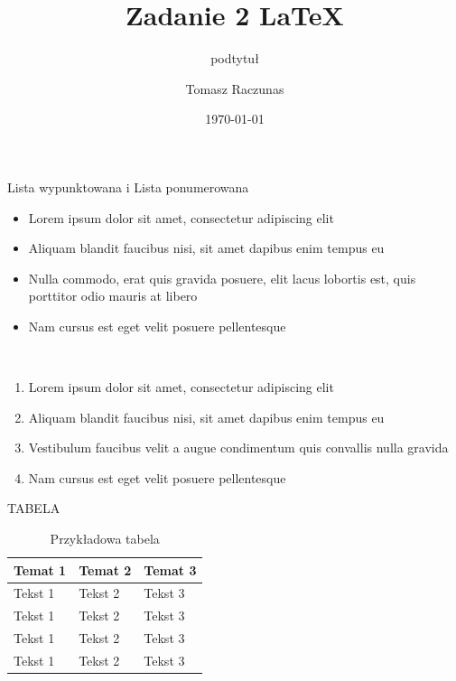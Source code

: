 \documentclass[aspectratio=169,xcolor=dvipsnames, t]{beamer}
\title[short title]{Zadanie 2 LaTeX } %
\subtitle{podtytuł}
\author[autor]{Tomasz Raczunas}
\institute[UG]{Uniwersytet Gdański \newline Wydział Informatyki}
\date{\today} %
\begin{document}
\maketitlepage


\begin{frame}{Lista wypunktowana i Lista ponumerowana}
\pause
    \begin{itemize}
        \item Lorem ipsum dolor sit amet, consectetur adipiscing elit
        \item Aliquam blandit faucibus nisi, sit amet dapibus enim tempus eu
        \item Nulla commodo, erat quis gravida posuere, elit lacus lobortis est, quis porttitor odio mauris at libero
        \item Nam cursus est eget velit posuere pellentesque
    \end{itemize}
\
\pause

    \begin{enumerate}
        \item Lorem ipsum dolor sit amet, consectetur adipiscing elit
        \item Aliquam blandit faucibus nisi, sit amet dapibus enim tempus eu
        \item Vestibulum faucibus velit a augue condimentum quis convallis nulla gravida
        \item Nam cursus est eget velit posuere pellentesque
    \end{enumerate}
\end{frame}


\begin{frame}{TABELA}
    \begin{table}
        \begin{tabular}{l l l}
            \toprule
            \textbf{Temat 1} & \textbf{Temat 2} & \textbf{Temat 3} \\
            \midrule
            Tekst 1         & Tekst 2           & Tekst 3               \\
            Tekst 1         & Tekst 2           & Tekst 3               \\
            Tekst 1         & Tekst 2           & Tekst 3               \\
            Tekst 1         & Tekst 2           & Tekst 3               \\
            \bottomrule
        \end{tabular}
        \caption{Przykładowa tabela}
        \label{tabela}
    \end{table}
\end{frame}
\end{document}
